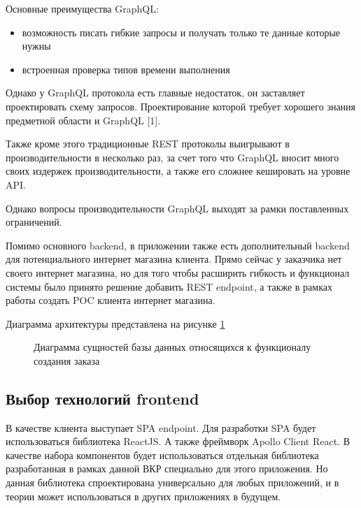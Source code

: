 \documentclass[a4paper,article,14pt]{extarticle}
\begin{document}
Основные преимущества GraphQL:

\begin{itemize}
    \item возможность писать гибкие запросы и получать только те данные которые нужны
    \item встроенная проверка типов времени выполнения
\end{itemize}

Однако у GraphQL протокола есть главные недостаток, он заставляет проектировать схему запросов.
Проектирование которой требует хорошего знания предметной области и GraphQL [1]. 

Также кроме этого традиционные REST протоколы выигрывают в производительности в несколько раз, за счет того что 
GraphQL вносит много своих издержек производительности, а также его сложнее кешировать на уровне API. 

Однако вопросы производительности GraphQL выходят за рамки поставленных ограничений.

Помимо основного backend, в приложении также есть дополнительный backend для потенциального интернет магазина клиента.
Прямо сейчас у заказчика нет своего интернет магазина, но для того чтобы расширить гибкость и функционал системы было принято решение
добавить REST endpoint, а также в рамках работы создать POC клиента интернет магазина.

Диаграмма архитектуры представлена на рисунке \ref{arch}

\begin{figure}[ht]
\begin{center}
\caption{\label{arch} Диаграмма сущностей базы данных относящихся к функционалу создания заказа}
\end {center}
\end {figure}

\subsection{Выбор технологий frontend}

В качестве клиента выступает SPA endpoint. Для разработки SPA будет использоваться библиотека ReactJS.
А также фреймворк Apollo Client React. 
В качестве набора компонентов будет использоваться отдельная библиотека разработанная в рамках данной ВКР специально для
этого приложения. Но данная библиотека спроектирована универсально для любых приложений, 
и в теории может использоваться в других приложениях в будущем.
\end{document}
